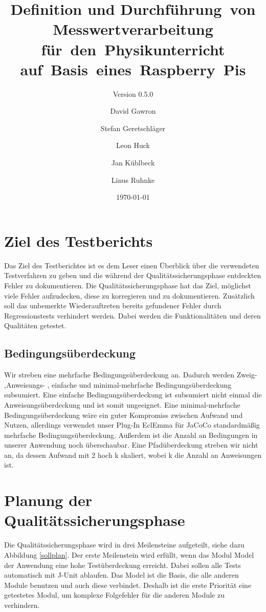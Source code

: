 \documentclass[parskip=full]{scrartcl}
\title{Definition und Durchführung~von Messwertverarbeitung für~den~Physikunterricht auf~Basis~eines~Raspberry~Pis}
\subtitle{Version 0.5.0}
\author{David Gawron \and Stefan Geretschläger \and Leon Huck \and Jan Küblbeck \and Linus Ruhnke}
\date{\today}
\begin{document}
\maketitle

\clearpage
\tableofcontents 					%

\clearpage
\section{Ziel des Testberichts} \label{einleitung}

Das Ziel des Testberichtes ist es dem Leser einen Überblick über die verwendeten Testverfahren zu geben und die während der Qualitätssicherungsphase entdeckten Fehler zu dokumentieren. Die Qualitätssicherungsphase hat das Ziel, möglichst viele Fehler aufzudecken, diese zu korregieren und zu dokumentieren. Zusätzlich soll das unbemerkte Wiederauftreten bereits gefundener Fehler durch Regressionstests verhindert werden. Dabei werden die Funktionalitäten und deren Qualitäten getestet.


\subsection{Bedingungsüberdeckung}
Wir streben eine mehrfache Bedingungsüberdeckung an. Dadurch werden Zweig- ,Anweisungs- , einfache und minimal-mehrfache Bedingungsüberdeckung subsumiert. Eine einfache Bedingungsüberdeckung ist subsumiert nicht einmal die Anweisungsüberdeckung und ist somit ungeeignet. Eine minimal-mehrfache Bedingungsüberdeckung wäre ein guter Kompromiss zwischen Aufwand und Nutzen, allerdings verwendet unser Plug-In \gls{EclEmma} für \gls{JaCoCo} standardmäßig mehrfache Bedingungsüberdeckung. Außerdem ist die Anzahl an Bedingungen in unserer Anwendung noch überschaubar.
Eine Pfadüberdeckung streben wir nicht an, da dessen Aufwand mit 2 hoch k skaliert, wobei k die Anzahl an Anweisungen ist. 

\clearpage
\section{Planung der Qualitätssicherungsphase} \label{planung}

Die Qualitätssicherungsphase wird in drei Meilensteine aufgeteilt, siehe dazu Abbildung \ref{sollplan}. Der erste Meilenstein wird erfüllt, wenn das Modul Model der Anwendung eine hohe Testüberdeckung erreicht. Dabei sollen alle Tests automatisch mit J-Unit ablaufen. Das Model ist die Basis, die alle anderen Module benutzen und auch diese verbindet. Deshalb ist die erste Priorität eine getestetes Modul, um komplexe Folgefehler für die anderen Module zu verhindern. 
\end{document}
